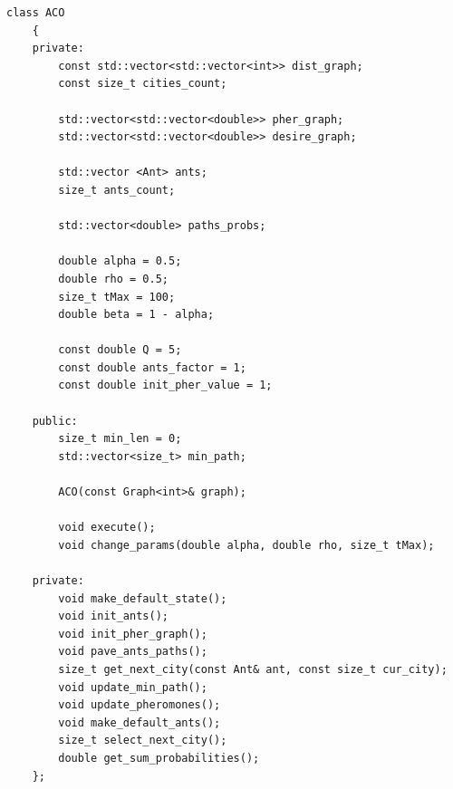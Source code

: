 \documentclass[12pt, a4paper]{report}
\begin{document}
    \begin{lstlisting}[label=code_aco_class,caption=Класс алгоритма ACO]
    class ACO
    {
    private:
    	const std::vector<std::vector<int>> dist_graph;
    	const size_t cities_count;
    
    	std::vector<std::vector<double>> pher_graph;
    	std::vector<std::vector<double>> desire_graph;
    
    	std::vector <Ant> ants;
    	size_t ants_count;
    
    	std::vector<double> paths_probs;
    
    	double alpha = 0.5;
    	double rho = 0.5;
    	size_t tMax = 100;
    	double beta = 1 - alpha;
    
   	 	const double Q = 5;
    	const double ants_factor = 1;
    	const double init_pher_value = 1;
    
    public:
    	size_t min_len = 0;
    	std::vector<size_t> min_path;
    
    	ACO(const Graph<int>& graph);
    
    	void execute();
    	void change_params(double alpha, double rho, size_t tMax);
    
    private:
    	void make_default_state();
	    void init_ants();
	    void init_pher_graph();
	    void pave_ants_paths();
	    size_t get_next_city(const Ant& ant, const size_t cur_city);
	    void update_min_path();
	    void update_pheromones();
	    void make_default_ants();
	    size_t select_next_city();
	    double get_sum_probabilities();
    };
    \end{lstlisting}
    
\end{document}

